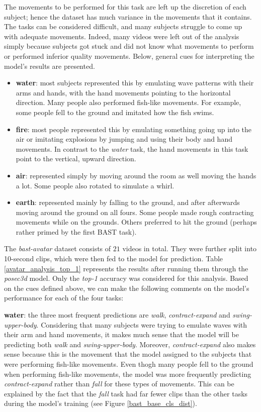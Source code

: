 \documentclass[extern,palatino]{cgMA}
\begin{document}
The movements to be performed for this task are left up the discretion of each subject; hence the dataset has much variance in the movements that it contains. The tasks can be considered difficult, and many subjects struggle to come up with adequate movements. Indeed, many videos were left out of the analysis simply because subjects got stuck and did not know what movements to perform or performed inferior quality movements. Below, general cues for interpreting the model's results are presented.

\begin{itemize}
    \item \textbf{water}: most subjects represented this by emulating wave patterns with their arms and hands, with the hand movements pointing to the horizontal direction. Many people also performed fish-like movements. For example, some people fell to the ground and imitated how the fish swims.
    \item \textbf{fire}: most people represented this by emulating something going up into the air or imitating explosions by jumping and using their body and hand movements. In contrast to the \textit{water} task, the hand movements in this task point to the vertical, upward direction.
    \item \textbf{air}: represented simply by moving around the room as well moving the hands a lot. Some people also rotated to simulate a whirl.
    \item \textbf{earth}: represented mainly by falling to the ground, and after afterwards moving around the ground on all fours. Some people made rough contracting movements while on the grounds. Others preferred to hit the ground (perhaps rather primed by the first BAST task).
\end{itemize}

\noindent The \textit{bast-avatar} dataset consists of $21$ videos in total. They were further split into 10-second clips, which were then fed to the model for prediction. Table \ref{avatar_analysis_top_1} represents the results after running them through the \textit{posec3d} model. Only the \textit{top-1} accuracy was considered for this analysis. Based on the cues defined above, we can make the following comments on the model's performance for each of the four tasks:

\bigskip
\noindent\textbf{water}: the three most frequent predictions are \textit{walk}, \textit{contract-expand} and \textit{swing-upper-body}. Considering that many subjects were trying to emulate waves with their arm and hand movements, it makes much sense that the model will be predicting both \textit{walk} and \textit{swing-upper-body}. Moreover, \textit{contract-expand} also makes sense because this is the movement that the model assigned to the subjects that were performing fish-like movements. Even thogh many people fell to the ground when performing fish-like movements, the model was more frequently predicting \textit{contract-expand} rather than \textit{fall} for these types of movements. This can be explained by the fact that the \textit{fall} task had far fewer clips than the other tasks during the model's training (see Figure \ref{bast_base_cls_dist}).
\end{document}
